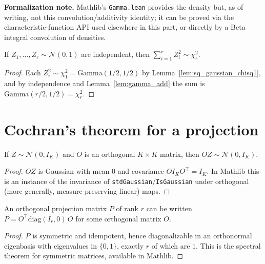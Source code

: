 \textbf{Formalization note.} Mathlib's \texttt{Gamma.lean} provides the density
but, as of writing, not this convolution/additivity identity; it can be proved via
the characteristic-function API used elsewhere in this part, or directly by a Beta
integral convolution of densities.

\begin{lemma}\label{lem:sum_sq_chisq}
If $Z_1,\dots,Z_r\sim\mathcal{N}(0,1)$ are independent, then
$\sum_{i=1}^r Z_i^2\sim\chi^2_r$.
\end{lemma}

\begin{proof}
Each $Z_i^2\sim\chi^2_1=\mathrm{Gamma}(1/2,1/2)$ by
Lemma~\ref{lem:sq_gaussian_chisq1}, and by independence and
Lemma~\ref{lem:gamma_add} the sum is $\mathrm{Gamma}(r/2,1/2)=\chi^2_r$.
\end{proof}

\section{Cochran's theorem for a projection}
\label{sec:pre_cochran_thm}

\begin{lemma}\label{lem:gaussian_rotation}
If $Z\sim\mathcal{N}(0,I_K)$ and $O$ is an orthogonal $K\times K$ matrix, then
$OZ\sim\mathcal{N}(0,I_K)$.
\end{lemma}

\begin{proof}
$OZ$ is Gaussian with mean $0$ and covariance $O I_K O^\top = I_K$. In Mathlib
this is an instance of the invariance of \texttt{stdGaussian}/\texttt{IsGaussian}
under orthogonal (more generally, measure-preserving linear) maps.
\end{proof}

\begin{lemma}\label{lem:proj_diag}
An orthogonal projection matrix $P$ of rank $r$ can be written
$P = O^\top \mathrm{diag}(I_r, 0)\, O$ for some orthogonal matrix $O$.
\end{lemma}

\begin{proof}
$P$ is symmetric and idempotent, hence diagonalizable in an orthonormal
eigenbasis with eigenvalues in $\{0,1\}$, exactly $r$ of which are $1$. This is
the spectral theorem for symmetric matrices, available in Mathlib.
\end{proof}

